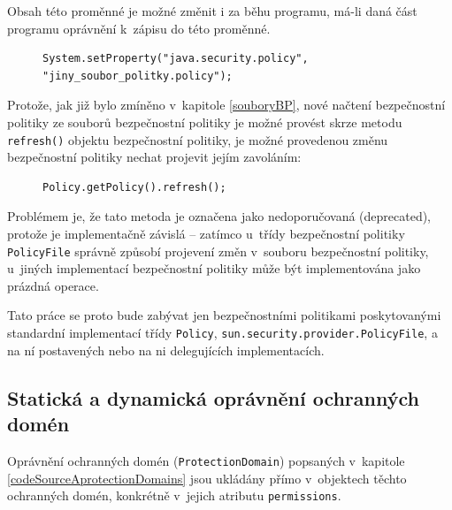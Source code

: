 Obsah této proměnné je možné změnit i za běhu programu, má-li daná část programu oprávnění k~zápisu do této proměnné.

\begin{figure}[tbh]
\begin{lstlisting}[caption=Nastavení souboru bezpečnostní politiky zevnitř JVM, label=nastaveniBP3]
System.setProperty("java.security.policy", "jiny_soubor_politky.policy");
\end{lstlisting}
\end{figure}

Protože, jak již bylo zmíněno v~kapitole \ref{souboryBP}, nové načtení bezpečnostní politiky ze souborů bezpečnostní politiky je možné provést
skrze metodu {\tt refresh()} objektu bezpečnostní politiky, je možné provedenou změnu bezpečnostní politiky nechat projevit jejím zavoláním:

\begin{figure}[tbh]
\begin{lstlisting}[caption=Znovunačtení souboru bezpečnostní politiky, label=refreshBP]
Policy.getPolicy().refresh();
\end{lstlisting}
\end{figure}

Problémem je, že tato metoda je označena jako nedoporučovaná (deprecated), protože je implementačně závislá -- zatímco u~třídy bezpečnostní politiky {\tt PolicyFile} správně způsobí projevení změn v~souboru bezpečnostní politiky, u~jiných implementací bezpečnostní politiky může být implementována jako prázdná operace. \cite{refPolicy}

Tato práce se proto bude zabývat jen bezpečnostními politikami poskytovanými standardní implementací třídy {\tt Policy}, {\tt sun.security.provider.PolicyFile}, a na ní postavených nebo na ni delegujících implementacích.

\subsection{Statická a dynamická oprávnění ochranných domén} \label{staticPerm}

Oprávnění ochranných domén ({\tt ProtectionDomain}) popsaných v~kapitole \ref{codeSourceAprotectionDomains} jsou ukládány přímo v~objektech těchto ochranných domén,
konkrétně v~jejich atributu {\tt permissions}.~\cite{sourceProtectionDomain}

